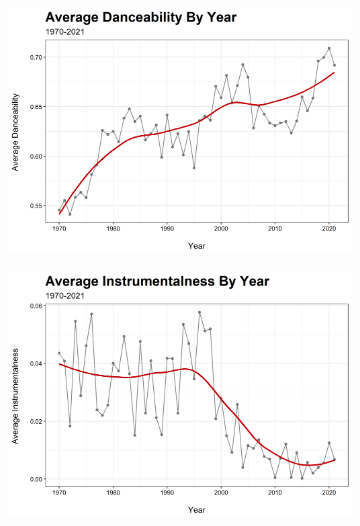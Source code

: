 \documentclass[12pt, twoside]{article}
\begin{document}
\begin{figure}[H]
\begin{subfigure}[b]{0.5\textwidth}
\centering
\includegraphics[width = \textwidth]{track_danceability_trend_.png}
\caption{}
\label{fig:danceability_trend}
\end{subfigure}
\begin{subfigure}[b]{0.5\textwidth}
\centering
\includegraphics[width = \textwidth]{track_instrumentalness_trend_.png}
\caption{}
\label{fig:instrumentalness_trend}
\end{subfigure}
\begin{subfigure}[b]{0.5\textwidth}
\centering

\end{subfigure}
\end{figure}
\end{document}
